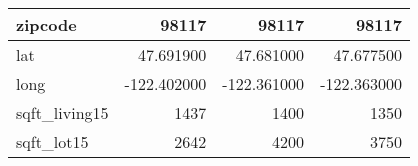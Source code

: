 \begin{table}[H]
\begin{tabular}{|l|r|r|r|}
\hline zipcode & \cellcolor[rgb]{0.9, 0.54, 0.52} 98117 & \cellcolor[rgb]{0.9, 0.54, 0.52} 98117 & \cellcolor[rgb]{0.9, 0.54, 0.52} 98117 \\
\hline lat & \cellcolor[rgb]{0.9, 0.54, 0.52} 47.691900 & 47.681000 & 47.677500 \\
\hline long & \cellcolor[rgb]{0.9, 0.54, 0.52} -122.402000 & \cellcolor[rgb]{0.9, 0.54, 0.52} -122.361000 & \cellcolor[rgb]{0.9, 0.54, 0.52} -122.363000 \\
\hline sqft\_living15 & \cellcolor[rgb]{0.9, 0.54, 0.52} 1437 & 1400 & 1350 \\
\hline sqft\_lot15 & \cellcolor[rgb]{0.9, 0.54, 0.52} 2642 & 4200 & 3750 \\
\hline
\end{tabular}
\end{table}
